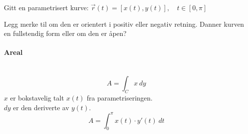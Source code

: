 Gitt en parametrisert kurve:
$\vec{r}(t) = [x(t), y(t)], \quad t \in [0, \pi]$

Legg merke til om den er orientert i positiv eller negativ retning.
Danner kurven en fullstendig form eller om den er åpen?



\paragraph{Areal} \mbox{} \\
$$A = \int_C x \: dy$$
$x$ er bokstavelig talt $x(t)$ fra parametriseringen.\\
$dy$ er den deriverte av $y(t)$.
$$A = \int_0^\pi x(t) \cdot y'(t) \:dt$$
